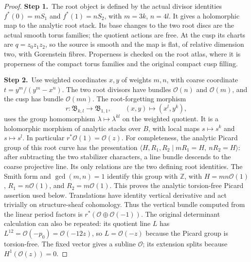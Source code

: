\begin{proof}
\par\smallskip\noindent\textbf{Step 1.}\ The root object is defined by the actual divisor identities
$f^*(0)=mS_1$ and $f^*(1)=nS_2$, with $m=3k$, $n=4l$.
It gives a holomorphic map to the analytic root stack.  Its base
changes to the two root discs are the actual smooth torus
families; the quotient actions are free.  At the cusp its charts
are $q=z_0z_1z_2$, so the source is smooth and the map is flat,
of relative dimension two, with Gorenstein fibres.  Properness is
checked on the root atlas, where it is properness of the compact
torus families and the original compact cusp filling.

\par\smallskip\noindent\textbf{Step 2.}\ Use weighted coordinates $x,y$ of weights $m,n$, with coarse
coordinate $t=y^m/(y^m-x^n)$.
The two root divisors have bundles $\mathcal O(n)$ and
$\mathcal O(m)$, and the cusp has bundle $\mathcal O(mn)$.
The root-forgetting morphism
\[
 r:\mathfrak B_{k,l}\longrightarrow\mathfrak B_{1,1},
 \qquad (x,y)\longmapsto(x^l,y^k),
\]
uses the group homomorphism $\lambda\mapsto\lambda^{kl}$ on
the weighted quotient.  It is a holomorphic morphism of analytic
stacks over $B$, with local maps $s\mapsto s^k$ and
$s\mapsto s^l$.  In particular $r^*\mathcal O(1)=\mathcal O(z)$.
For completeness, the analytic Picard group of this root curve has
the presentation
$\langle H,R_1,R_2\mid mR_1=H,\ nR_2=H\rangle$:
after subtracting the two stabilizer characters, a line bundle
descends to the coarse projective line.  Its only relations are
the two defining root identities.  The Smith form and
$\gcd(m,n)=1$ identify this group with $\mathbb Z$, with
$H=mn\mathcal O(1)$, $R_1=n\mathcal O(1)$, and
$R_2=m\mathcal O(1)$.  This proves the analytic torsion-free
Picard assertion used below.
Translations have identity vertical derivative and act trivially
on structure-sheaf cohomology.  Thus the vertical bundle computed
from the linear period factors is $r^*(\mathcal O\oplus
\mathcal O(-1))$.  The original determinant calculation can also
be repeated: its quotient line $L$ has
$L^{12}=\mathcal O(-p_0)=\mathcal O(-12z)$, so
$L=\mathcal O(-z)$ because the Picard group is torsion-free.
The fixed vector gives a subline $\mathcal O$; its extension
splits because $H^1(\mathcal O(z))=0$.


\end{proof}
